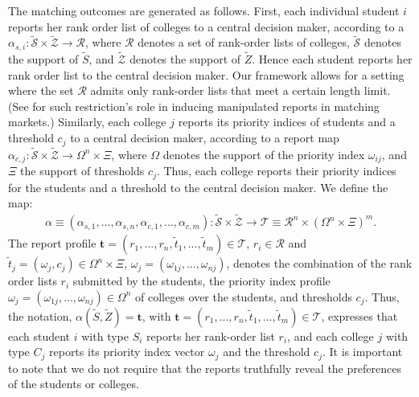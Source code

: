 \documentclass[12pt, fullpage]{amsart}
\theoremstyle{definition}
\theoremstyle{definition}
\theoremstyle{definition}
\begin{document}
\begin{bibunit}[econometrica]
The matching outcomes are generated as follows. First, each individual student $i$ reports her rank order list of colleges to a central decision maker, according to a  $\alpha_{s,i}: \mathcal{\tilde S} \times \mathcal{\tilde Z} \rightarrow \mathcal{R}$, where $\mathcal{R}$ denotes a set of rank-order lists of colleges, $\mathcal{\tilde S}$ denotes the support of $\tilde S$, and $\mathcal{\tilde Z}$ denotes the support of $\tilde Z$. Hence each student reports her rank order list to the central decision maker. Our framework allows for a setting where the set $\mathcal{R}$ admits only rank-order lists that meet a certain length limit. (See \cite{Kojima/Pathak:09:AER} for such restriction's role in inducing manipulated reports in matching markets.) Similarly, each college $j$ reports its priority indices of students and a threshold $c_j$ to a central decision maker, according to a report map $\alpha_{c,j}:\mathcal{\tilde S} \times \mathcal{\tilde Z} \rightarrow \Omega^n \times \Xi$, where $\Omega$ denotes the support of the priority index $\omega_{ij}$, and $\Xi$ the support of thresholds $c_{j}$. Thus, each college reports their priority indices for the students and a threshold to the central decision maker. We define the map:
\begin{align*}
	\alpha \equiv (\alpha_{s,1},...,\alpha_{s,n},\alpha_{c,1},...,\alpha_{c,m}): \mathcal{\tilde S} \times \mathcal{\tilde Z} \rightarrow \mathcal{T} \equiv \mathcal{R}^n \times \left(\Omega^{n} \times \Xi \right)^m.
\end{align*}
 The report profile $\boldsymbol{t} = (r_1,...,r_n,\tilde t_1,...,\tilde t_m) \in \mathcal{T}$, $r_i \in \mathcal{R}$ and $\tilde t_j = (\omega_j,c_j) \in \Omega^{n} \times \Xi$, $\omega_j = (\omega_{1j},...,\omega_{nj})$, denotes the combination of the rank order lists $r_i$ submitted by the students, the priority index profile $\omega_j = (\omega_{1j},...,\omega_{nj}) \in \Omega^n$ of colleges over the students, and thresholds $c_j$. Thus, the notation, $\alpha(\tilde S, \tilde Z) =\boldsymbol{t}$, with $\boldsymbol{t} = (r_1,...,r_n,\tilde t_1,...,\tilde t_m) \in \mathcal{T}$, expresses that each student $i$ with type $S_i$ reports her rank-order list $r_i$, and each college $j$ with type $C_j$ reports its priority index vector $\omega_j$ and the threshold $c_j$. It is important to note that we do not require that the reports truthfully reveal the preferences of the students or colleges.






\end{bibunit}
\end{document}
